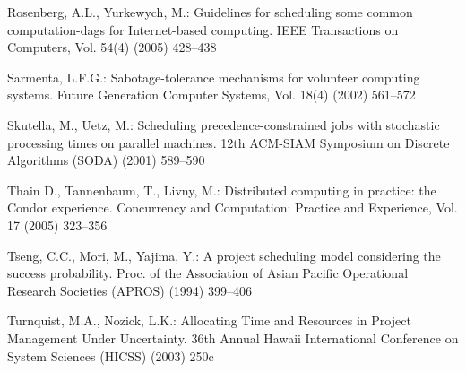 \documentclass[letterpaper,11pt]{article}
\newcommand{\remove}[1]{}
\begin{document}
\begin{thebibliography}{99}
Rosenberg, A.L., Yurkewych, M.:
Guidelines for scheduling some
common computation-dags for Internet-based computing.  
IEEE Transactions on Computers, Vol. 54(4) (2005)
428--438

Sarmenta, L.F.G.:
Sabotage-tolerance mechanisms for volunteer computing systems.
Future Generation Computer Systems, Vol. 18(4) (2002) 561--572

\remove{
\bibitem{STW98}
Sotskov, Y.N., Tanaev, V.S., Werner, F.:
On the Stability Radius of an Optimal Schedule: a Survey and Recent Developments.
Industrial Applications of Combinatorial Optimization, Kluwer Academic Publishers (1998) 72--108
}

Skutella, M., Uetz, M.:
Scheduling precedence-constrained jobs with stochastic processing times on parallel machines.
12th ACM-SIAM Symposium on Discrete Algorithms (SODA) (2001) 589--590

Thain D., Tannenbaum, T., Livny, M.: 
Distributed computing in practice: the Condor experience. 
Concurrency and Computation: Practice and Experience, Vol. 17 (2005) 323--356

Tseng, C.C., Mori, M., Yajima, Y.:
A project scheduling model considering the success probability.
Proc. of the Association of Asian Pacific Operational Research Societies (APROS) (1994) 399--406

Turnquist, M.A., Nozick, L.K.:
Allocating Time and Resources in Project Management Under Uncertainty.
36th Annual Hawaii International Conference on System Sciences (HICSS) (2003) 250c

\end{thebibliography}
\end{document}
